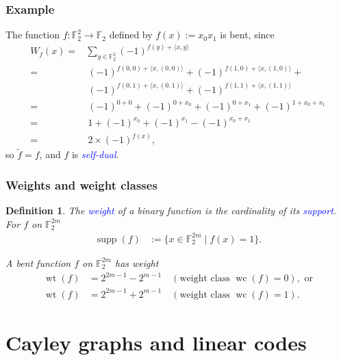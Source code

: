 \documentclass[pdf,sprung,slideColor,nocolorBG]{beamer}
\newenvironment{colortheme}[1]{
\def\ProvidesPackageRCS $##1${\relax}
\renewcommand{\ProcessOptions}{\relax}
\makeatletter

\makeatother
}{}
\newcommand{\mb}[1]{\mathbb{#1}}
\newcommand{\Emph}[1]{\emph{\textcolor{blue}{#1}}}
\newcommand{\To}{\rightarrow}
\newcommand{\Cay}[1]{\operatorname{Cay}\left(#1\right)}
\newcommand{\dual}[1]{\widetilde{#1}}
\newcommand{\support}[1]{\operatorname{supp}\left(#1\right)}
\newcommand{\weight}[1]{\operatorname{wt}\left(#1\right)}
\newcommand{\weightclass}[1]{\operatorname{wc}\left(#1\right)}
\newcommand{\F}{\mb{F}}
\newtheorem{Def}{Definition}
\begin{document}
\begin{colortheme}{jubata}

\begin{frame}
\frametitle{Example}

The function  $f : \F_2^2 \To \F_2$  defined by $f(x) := x_0 x_1$
is bent, since
\begin{align*}
W_f(x)
=&
\sum_{y \in \F_2^2} (-1)^{f(y) + \langle x, y \rangle}
\\
=&\ (-1)^{f(0,0) + \langle x, (0,0) \rangle}
 + (-1)^{f(1,0) + \langle x, (1,0) \rangle} +
\\
\phantom{=}&\ (-1)^{f(0,1) + \langle x, (0,1) \rangle}
 + (-1)^{f(1,1) + \langle x, (1,1) \rangle}
\\
=&\ (-1)^{0 + 0} + (-1)^{0 + x_0} + (-1)^{0 + x_1} + (-1)^{1 + x_0 + x_1}
\\
=&\ 1 + (-1)^{x_0} + (-1)^{x_1} - (-1)^{x_0 + x_1}
\\
=&\ 2 \times (-1)^{f(x)},
\end{align*}
so $\dual{f} = f$, and $f$ is \Emph{self-dual}.
%
\end{frame}

\begin{frame}
\frametitle{Weights and weight classes}
\begin{Def}
The \Emph{weight} of a binary function is the cardinality of its \Emph{support}.
For $f$ on $\F_2^{2m}$
\begin{align*}
\support{f} &:= \{x \in \F_2^{2m} \mid f(x)=1 \}.
\end{align*}

A bent function $f$ on $\F_2^{2m}$ has weight
\begin{align*}
\weight{f} &= 2^{2 m - 1} - 2^{m-1} \quad (\text{weight class~} \weightclass{f}=0), \text{~or}
\\
\weight{f} &= 2^{2 m - 1} + 2^{m-1} \quad (\text{weight class~} \weightclass{f}=1).
\end{align*}
\end{Def}
\end{frame}

\end{colortheme}

\section{Cayley graphs and linear codes}
\end{document}
